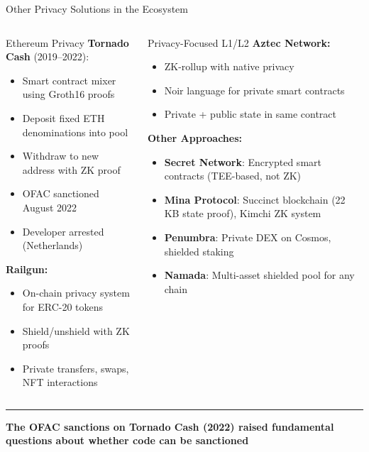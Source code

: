 \documentclass[8pt,aspectratio=169]{beamer}
\newcommand{\bottomnote}[1]{\vfill\vspace{-2mm}\textcolor{mllavender2}{\rule{\textwidth}{0.4pt}}\vspace{1mm}\footnotesize\textbf{#1}}
\begin{document}
\begin{frame}{Other Privacy Solutions in the Ecosystem}
\begin{columns}[T]
\begin{block}{\footnotesize Ethereum Privacy}
\footnotesize
\textbf{Tornado Cash} (2019--2022):
\begin{itemize}
\item Smart contract mixer using Groth16 proofs
\item Deposit fixed ETH denominations into pool
\item Withdraw to new address with ZK proof
\item OFAC sanctioned August 2022
\item Developer arrested (Netherlands)
\end{itemize}
\vspace{0.1cm}
\textbf{Railgun:}
\begin{itemize}
\item On-chain privacy system for ERC-20 tokens
\item Shield/unshield with ZK proofs
\item Private transfers, swaps, NFT interactions
\end{itemize}
\end{block}
\begin{block}{\footnotesize Privacy-Focused L1/L2}
\footnotesize
\textbf{Aztec Network:}
\begin{itemize}
\item ZK-rollup with native privacy
\item Noir language for private smart contracts
\item Private + public state in same contract
\end{itemize}
\vspace{0.1cm}
\textbf{Other Approaches:}
\begin{itemize}
\item \textbf{Secret Network}: Encrypted smart contracts (TEE-based, not ZK)
\item \textbf{Mina Protocol}: Succinct blockchain (22 KB state proof), Kimchi ZK system
\item \textbf{Penumbra}: Private DEX on Cosmos, shielded staking
\item \textbf{Namada}: Multi-asset shielded pool for any chain
\end{itemize}
\end{block}
\end{columns}
\bottomnote{The OFAC sanctions on Tornado Cash (2022) raised fundamental questions about whether code can be sanctioned}
\end{frame}
\end{document}
